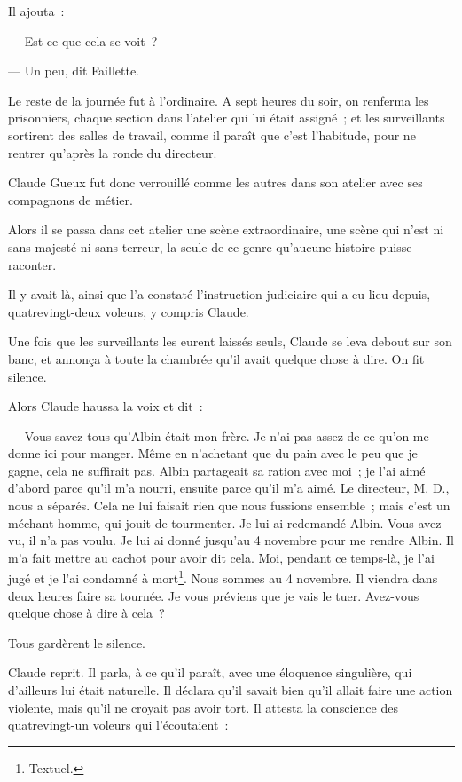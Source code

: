 \documentclass[french,twoside]{book} %
\begin{document}
Il ajouta :\par
— Est-ce que cela se voit ?\par
— Un peu, dit Faillette.\par
Le reste de la journée fut à l’ordinaire. A sept heures du soir, on renferma les prisonniers, chaque section dans l’atelier qui lui était assigné ; et les surveillants sortirent des salles de travail, comme il paraît que c’est l’habitude, pour ne rentrer qu’après la ronde du directeur.\par
Claude Gueux fut donc verrouillé comme les autres dans son atelier avec ses compagnons de métier.\par
Alors il se passa dans cet atelier une scène extraordinaire, une scène qui n’est ni sans majesté ni sans terreur, la seule de ce genre qu’aucune histoire puisse raconter.\par
Il y avait là, ainsi que l’a constaté l’instruction judiciaire qui a eu lieu depuis, quatrevingt-deux voleurs, y compris Claude.\par
Une fois que les surveillants les eurent laissés seuls, Claude se leva debout sur son banc, et annonça à toute la chambrée qu’il avait quelque chose à dire. On fit silence.\par
Alors Claude haussa la voix et dit :\par
— Vous savez tous qu’Albin était mon frère. Je n’ai pas assez de ce qu’on me donne ici pour manger. Même en n’achetant que du pain avec le peu que je gagne, cela ne suffirait pas. Albin partageait sa ration avec moi ; je l’ai aimé d’abord parce qu’il m’a nourri, ensuite parce qu’il m’a aimé. Le directeur, M. D.,  nous a séparés. Cela ne lui faisait rien que nous fussions ensemble ; mais c’est un méchant homme, qui jouit de tourmenter. Je lui ai redemandé Albin. Vous avez vu, il n’a pas voulu. Je lui ai donné jusqu’au 4 novembre pour me rendre Albin. Il m’a fait mettre au cachot pour avoir dit cela. Moi, pendant ce temps-là, je l’ai jugé et je l’ai condamné à mort\footnote{ \noindent Textuel.
 }. Nous sommes au 4 novembre. Il viendra dans deux heures faire sa tournée. Je vous préviens que je vais le tuer. Avez-vous quelque chose à dire à cela ?\par
Tous gardèrent le silence.\par
Claude reprit. Il parla, à ce qu’il paraît, avec une éloquence singulière, qui d’ailleurs lui était naturelle. Il déclara qu’il savait bien qu’il allait faire une action violente, mais qu’il ne croyait pas avoir tort. Il attesta la conscience des quatrevingt-un voleurs qui l’écoutaient :\par
\end{document}
